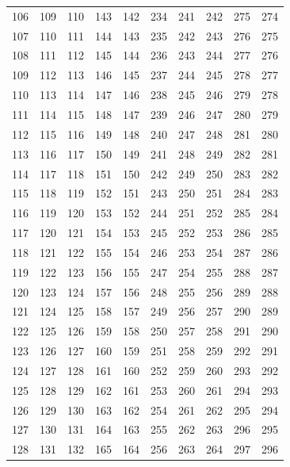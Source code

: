 \begin{longtable}{rrrrr@{\qquad}rrrrr}
106 & 109 & 110 & 143 & 142 & 234 & 241 & 242 & 275 & 274 \\
107 & 110 & 111 & 144 & 143 & 235 & 242 & 243 & 276 & 275 \\
108 & 111 & 112 & 145 & 144 & 236 & 243 & 244 & 277 & 276 \\
109 & 112 & 113 & 146 & 145 & 237 & 244 & 245 & 278 & 277 \\
110 & 113 & 114 & 147 & 146 & 238 & 245 & 246 & 279 & 278 \\
111 & 114 & 115 & 148 & 147 & 239 & 246 & 247 & 280 & 279 \\
112 & 115 & 116 & 149 & 148 & 240 & 247 & 248 & 281 & 280 \\
113 & 116 & 117 & 150 & 149 & 241 & 248 & 249 & 282 & 281 \\
114 & 117 & 118 & 151 & 150 & 242 & 249 & 250 & 283 & 282 \\
115 & 118 & 119 & 152 & 151 & 243 & 250 & 251 & 284 & 283 \\
116 & 119 & 120 & 153 & 152 & 244 & 251 & 252 & 285 & 284 \\
117 & 120 & 121 & 154 & 153 & 245 & 252 & 253 & 286 & 285 \\
118 & 121 & 122 & 155 & 154 & 246 & 253 & 254 & 287 & 286 \\
119 & 122 & 123 & 156 & 155 & 247 & 254 & 255 & 288 & 287 \\
120 & 123 & 124 & 157 & 156 & 248 & 255 & 256 & 289 & 288 \\
121 & 124 & 125 & 158 & 157 & 249 & 256 & 257 & 290 & 289 \\
122 & 125 & 126 & 159 & 158 & 250 & 257 & 258 & 291 & 290 \\
123 & 126 & 127 & 160 & 159 & 251 & 258 & 259 & 292 & 291 \\
124 & 127 & 128 & 161 & 160 & 252 & 259 & 260 & 293 & 292 \\
125 & 128 & 129 & 162 & 161 & 253 & 260 & 261 & 294 & 293 \\
126 & 129 & 130 & 163 & 162 & 254 & 261 & 262 & 295 & 294 \\
127 & 130 & 131 & 164 & 163 & 255 & 262 & 263 & 296 & 295 \\
128 & 131 & 132 & 165 & 164 & 256 & 263 & 264 & 297 & 296 \\
\bottomrule\end{longtable}\normalsize